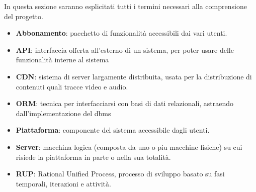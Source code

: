  In questa sezione saranno esplicitati tutti i termini necessari alla comprensione del progetto.

\begin{itemize}
	\item \textbf{Abbonamento}: pacchetto di funzionalità accessibili dai vari utenti.
	\item \textbf{API}: interfaccia offerta all'esterno di un sistema, per poter usare delle funzionalità interne al sistema
	\item \textbf{CDN}: sistema di server largamente distribuita, usata per la distribuzione di contenuti quali tracce video e audio.
	\item \textbf{ORM}: tecnica per interfacciarsi con basi di dati relazionali, astraendo dall'implementazione del dbms
	\item \textbf{Piattaforma}: componente del sistema accessibile dagli utenti.
	\item \textbf{Server}: macchina logica (composta da uno o piu macchine fisiche) su cui risiede la piattaforma in parte o nella sua totalità.
	\item \textbf{RUP}: Rational Unified Process, processo di sviluppo basato su fasi temporali, iterazioni e attività.
\end{itemize}